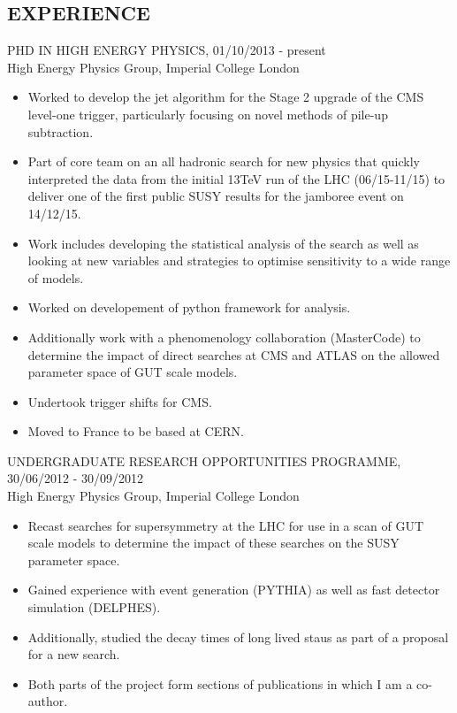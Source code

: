 \documentclass[9pt]{res} %
\begin{document}
\begin{resume}
\section{EXPERIENCE} 
\vspace{0.2cm}
PHD IN HIGH ENERGY PHYSICS, 01/10/2013 - present \\
\vspace{0.1cm}
High Energy Physics Group, Imperial College London 
   \begin{itemize} \itemsep -2pt  %
   \item Worked to develop the jet algorithm for the Stage 2 upgrade of the CMS level-one trigger, particularly focusing on novel methods of pile-up subtraction.
   \item Part of core team on an all hadronic search for new physics that quickly interpreted the data from the initial 13TeV run of the LHC (06/15-11/15) to deliver one of the first public SUSY results for the jamboree event on 14/12/15. 
   \item Work includes developing the statistical analysis of the search as well as looking at new variables and strategies to optimise sensitivity to a wide range of models.
   \item Worked on developement of python framework for analysis. 
   \item Additionally work with a phenomenology collaboration (MasterCode) to determine the impact of direct searches at CMS and ATLAS on the allowed parameter space of GUT scale models.
   \item Undertook trigger shifts for CMS.
   \item Moved to France to be based at CERN. 
 \end{itemize}

UNDERGRADUATE RESEARCH OPPORTUNITIES PROGRAMME, 30/06/2012 - 30/09/2012 \\
\vspace{0.1cm}
High Energy Physics Group, Imperial College London
   \begin{itemize} \itemsep -2pt  %
   \item Recast searches for supersymmetry at the LHC for use in a scan of GUT scale models to determine the impact of these searches on the SUSY parameter space.
   \item Gained experience with event generation (PYTHIA) as well as fast detector simulation (DELPHES).
   \item Additionally, studied the decay times of long lived staus as part of a proposal for a new search.
   \item Both parts of the project form sections of publications in which I am a co-author.
 \end{itemize}


\end{resume}
\end{document}
